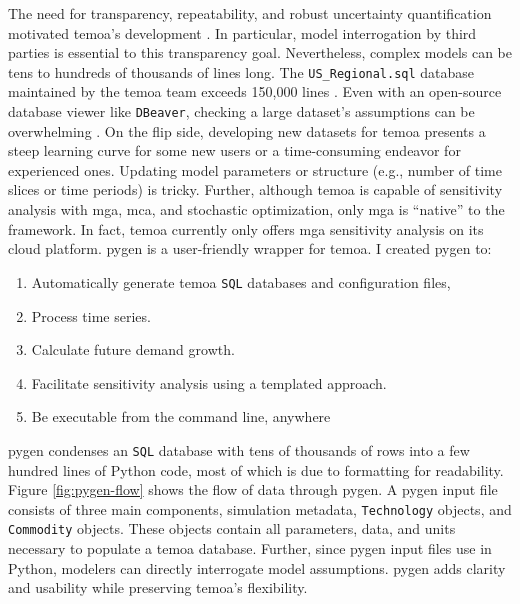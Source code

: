 The need for transparency, repeatability, and robust uncertainty quantification
motivated \gls{temoa}'s development \cite{hunter_modeling_2013}.
In particular, model interrogation by third parties is essential to this transparency
goal. Nevertheless, complex models can be tens to hundreds of thousands of lines long.
The \texttt{US\_Regional.sql} database maintained by the \gls{temoa} team exceeds
150,000 lines \cite{model_databases_2021}. Even with an open-source
database viewer like \texttt{DBeaver}, checking a large dataset's assumptions can be
overwhelming \cite{noauthor_dbeaver_nodate}. On the flip side, developing new datasets
for \gls{temoa} presents a steep learning curve for some new users or a time-consuming
endeavor for experienced ones. Updating model parameters or structure (e.g., number
of time slices or time periods) is tricky. Further, although \gls{temoa}
is capable of sensitivity analysis with \gls{mga}, \gls{mca}, and stochastic
optimization, only \gls{mga} is ``native'' to the framework. In fact, \gls{temoa}
currently only offers \gls{mga} sensitivity analysis on its cloud platform.
\gls{pygen} is a user-friendly wrapper for \gls{temoa}.
I created \gls{pygen} to:
\begin{enumerate}
  \item Automatically generate \gls{temoa} \texttt{SQL} databases and configuration files,
  \item Process time series.
  \item Calculate future demand growth.
  \item Facilitate sensitivity analysis using a templated approach.
  \item Be executable from the command line, anywhere
\end{enumerate}
\gls{pygen} condenses an \texttt{SQL} database with tens of thousands of rows into
a few hundred lines of Python code, most of which is due to formatting for
readability. Figure \ref{fig:pygen-flow} shows the flow of data through \gls{pygen}.
A \gls{pygen} input file consists of three main components, simulation metadata,
\texttt{Technology} objects, and \texttt{Commodity} objects. These objects
contain all parameters, data, and units necessary to populate a \gls{temoa}
database. Further, since \gls{pygen} input files use in Python, modelers
can directly interrogate model assumptions. \gls{pygen} adds clarity and usability
while preserving \gls{temoa}'s flexibility.

